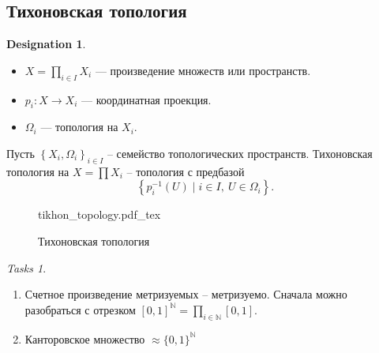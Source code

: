 \documentclass[11pt]{book}
\newcommand{\incfig}[1]{%
    \def\svgwidth{\columnwidth}
    {#1.pdf_tex}
}
\newcommand{\N}{\mathbb{N}}
\theoremstyle{definition}
\theoremstyle{plain}
\theoremstyle{plain}
\theoremstyle{definition}
\newtheorem*{name}{Designation}
\theoremstyle{remark}
\newtheorem*{tasks}{Tasks}
\begin{document}
\subsection{Тихоновская топология}
\begin{name}
    $ $
    \begin{itemize}
	\item $ X = \prod_{i \in  I} X_i $ --- произведение множеств или пространств.
	\item $ p_i: X \to  X_i$ --- координатная проекция.
	\item $ \Omega_i$ --- топология на $ X_i$.
    \end{itemize}
\end{name}
\begin{defn}

    Пусть $\left \{ X_i, \Omega_i \right \}_{i \in  I}$ -- семейство топологических пространств.
    Тихоновская топология на $X = \prod X_i$ -- топология с предбазой
    \[
	\left \{ p^{-1}_i (U)  \mid i \in  I, ~ U \in  \Omega_i \right \}
    .\]
\end{defn}
\begin{figure}[ht]
    \centering
    \incfig{tikhon_topology}
    \caption{Тихоновская топология}
    \label{fig:tikhon_topology}
\end{figure}
\begin{tasks}
    $ $
    \begin{enumerate}
	\item Счетное произведение метризуемых -- метризуемо. Сначала можно разобраться с отрезком $[0, 1]^\N = \prod_{i \in  \N} [0, 1]$.
	\item Канторовское множество $\approx \{0, 1\}^\N$
    \end{enumerate}
\end{tasks}
\end{document}
